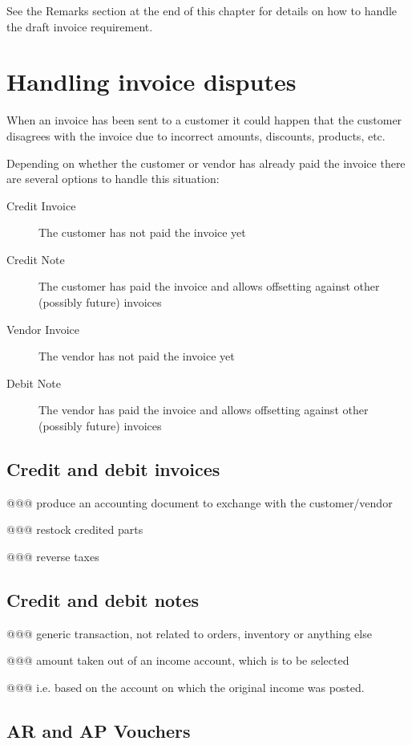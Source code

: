 See the Remarks section at the end of this chapter for details on how to handle
the draft invoice requirement.


\section{Handling invoice disputes}
\label{sec-business-processes-invoicing-handling-disputes}

When an invoice has been sent to a \gls{customer} it could happen that the customer disagrees
with the invoice due to incorrect amounts, discounts, products, etc.

Depending on whether the customer or vendor has already paid the invoice there are several
options to handle this situation:

\begin{description}
\item [Credit Invoice] The \gls{customer} has not paid the invoice yet
\item [Credit Note] The customer has paid the invoice and allows offsetting against
   other (possibly future) invoices
\item [Vendor Invoice] The \gls{vendor} has not paid the invoice yet
\item [Debit Note] The vendor has paid the invoice and allows offsetting against
other (possibly future) invoices
\end{description}

\subsection{Credit and debit invoices}

@@@ produce an accounting document to exchange with the customer/vendor

@@@ restock credited parts

@@@ reverse taxes

\subsection{Credit and debit notes}

@@@ generic transaction, not related to orders, inventory or anything else

@@@ amount taken out of an income account, which is to be selected

@@@ i.e. based on the account on which the original income was posted.

\subsection{AR and AP Vouchers}

